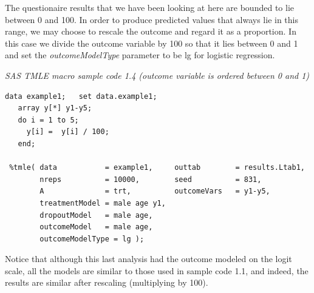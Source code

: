 \documentclass[10pt]{article}
\renewcommand{\baselinestretch}{1.3}
\begin{document}

\newpage
The questionaire results that we have been looking at here are bounded to lie between 0 and 100.  In order to produce predicted values that always lie in this range, we may choose to rescale the outcome and regard it as a proportion.  In this case we divide the outcome variable by 100 so that it lies between 0 and 1 and set the {\em outcomeModelType} parameter to be lg for logistic regression.
\vspace{0.1in}

\begin{minipage}{\textwidth}
\renewcommand{\baselinestretch}{1.0}\selectfont%
\begin{minipage}[l]{5.6in}
\normalsize\em%
SAS TMLE macro sample code 1.4 (outcome variable is ordered between 0 and 1)
\end{minipage}\vspace{-0.08in}
\begin{Verbatim}[baselinestretch=0.9, fontsize=\small, frame=single, commandchars=\\\{\}]
 data example1;   set data.example1;
   array y[*] y1-y5;
   do i = 1 to 5;
     y[i] =  y[i] / 100;
   end; 

 %tmle( data           = example1,     outtab        = results.Ltab1,
        nreps          = 10000,        seed          = 831,
        A              = trt,          outcomeVars   = y1-y5,
        treatmentModel = male age y1,
        dropoutModel   = male age,
        outcomeModel   = male age,
        outcomeModelType = lg );  
\end{Verbatim}
\end{minipage}
\vspace{0.2in}



Notice that although this last analysis had the outcome modeled on the logit scale, all the models are similar to those used in sample code 1.1, and indeed, the results are similar after rescaling (multiplying by 100).
\end{document}
